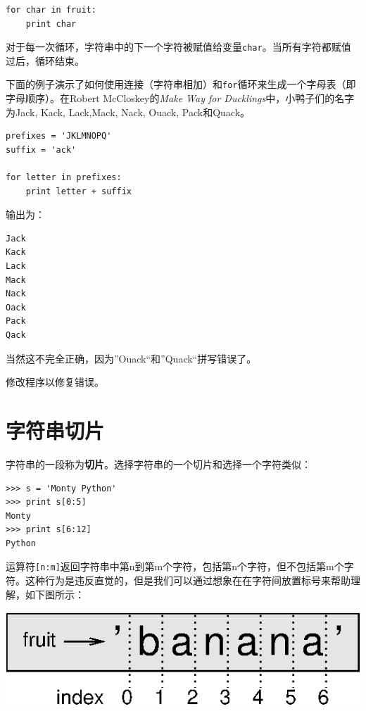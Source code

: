 \beforeverb
\begin{verbatim}
for char in fruit:
    print char
\end{verbatim}
\afterverb
%
对于每一次循环，字符串中的下一个字符被赋值给变量{\tt char}。当所有字符都赋值过后，循环结束。


下面的例子演示了如何使用连接（字符串相加）和{\tt for}循环来生成一个字母表（即字母顺序）。在Robert McCloskey的{\em Make Way for Ducklings}中，小鸭子们的名字为Jack, Kack, Lack,Mack, Nack, Ouack, Pack和Quack。

\beforeverb
\begin{verbatim}
prefixes = 'JKLMNOPQ'
suffix = 'ack'

for letter in prefixes:
    print letter + suffix
\end{verbatim}
\afterverb
%
输出为：

\beforeverb
\begin{verbatim}
Jack
Kack
Lack
Mack
Nack
Oack
Pack
Qack
\end{verbatim}
\afterverb
%
当然这不完全正确，因为”Ouack“和”Quack“拼写错误了。

\begin{ex}
修改程序以修复错误。
\end{ex}



\section{字符串切片}
\label{切片}


字符串的一段称为{\bf 切片}。选择字符串的一个切片和选择一个字符类似：

\beforeverb
\begin{verbatim}
>>> s = 'Monty Python'
>>> print s[0:5]
Monty
>>> print s[6:12]
Python
\end{verbatim}
\afterverb
%
运算符{\tt [n:m]}返回字符串中第n到第m个字符，包括第n个字符，但不包括第m个字符。这种行为是违反直觉的，但是我们可以通过想象在在字符间放置标号来帮助理解，如下图所示：

\beforefig
\centerline{\includegraphics{figs/banana.eps}}
\afterfig

